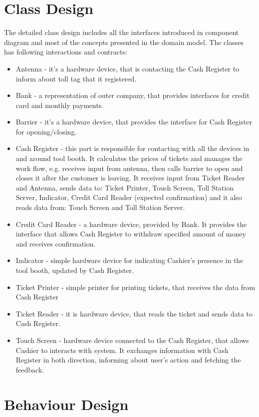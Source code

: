 \section{Class Design}
The detailed class design includes all the interfaces introduced in component diagram and most of the concepts presented in the domain model. 
The classes has following interactions and contracts:
\begin{itemize}
\item Antenna - it's a hardware device, that is contacting the Cash Register to inform about toll tag that it registered.
\item Bank - a representation of outer company, that provides interfaces for credit card and monthly payments. 
\item Barrier - it's a hardware device, that provides the interface for Cash Register for opening/closing.
\item Cash Register - this part is responsible for contacting with all the devices in and around tool booth. It calculates the prices of tickets and manages the work flow, e.g. receives input from antenna, then calls barrier to open and closes it after the customer is leaving. It receives input from Ticket Reader and Antenna, sends data to: Ticket Printer, Touch Screen, Toll Station Server, Indicator, Credit Card Reader (expected confirmation) and it also reads data from: Touch Screen and Toll Station Server.
\item Credit Card Reader - a hardware device, provided by Bank. It provides the interface that allows Cash Register to withdraw specified amount of money and receives confirmation.
\item Indicator - simple hardware device for indicating Cashier's presence in the tool booth, updated by Cash Register.
\item Ticket Printer - simple printer for printing tickets, that receives the data from Cash Register
\item Ticket Reader - it is hardware device, that reads the ticket and sends data to Cash Register.
\
\item Touch Screen - hardware device connected to the Cash Register, that allows Cashier to interacts with system. It exchanges information with Cash Register in both direction, informing about user's action and fetching the feedback. 

\end{itemize}


\section{Behaviour Design}
